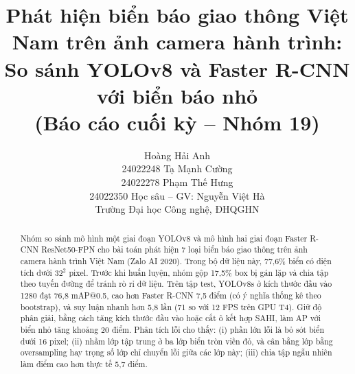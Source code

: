 \documentclass[11pt]{article}
\title{Phát hiện biển báo giao thông Việt Nam trên ảnh camera hành trình:\\
So sánh YOLOv8 và Faster R-CNN với biển báo nhỏ\\
(Báo cáo cuối kỳ -- Nhóm 19)}
\author{
Hoàng Hải Anh \\ 24022248
\And
Tạ Mạnh Cường \\ 24022278
\And
Phạm Thế Hưng \\ 24022350
\AND
Học sâu -- GV: Nguyễn Việt Hà \\
Trường Đại học Công nghệ, ĐHQGHN
}
\begin{document}
\maketitle

\begin{abstract}
Nhóm so sánh mô hình một giai đoạn YOLOv8 và mô hình hai giai đoạn Faster R-CNN ResNet50-FPN cho bài toán phát hiện 7 loại biển báo giao thông trên ảnh camera hành trình Việt Nam (Zalo AI 2020). Trong bộ dữ liệu này, 77,6\% biển có diện tích dưới $32^2$ pixel.
Trước khi huấn luyện, nhóm gộp 17,5\% box bị gán lặp và chia tập theo tuyến đường để tránh rò rỉ dữ liệu.
Trên tập test, YOLOv8s ở kích thước đầu vào 1280 đạt 76,8 mAP@0.5, cao hơn Faster R-CNN 7,5 điểm (có ý nghĩa thống kê theo bootstrap), và suy luận nhanh hơn 5,8 lần (71 so với 12 FPS trên GPU T4).
Giữ độ phân giải, bằng cách tăng kích thước đầu vào hoặc cắt ô kết hợp SAHI, làm AP với biển nhỏ tăng khoảng 20 điểm.
Phân tích lỗi cho thấy:
(i) phần lớn lỗi là bỏ sót biển dưới 16 pixel;
(ii) nhầm lớp tập trung ở ba lớp biển tròn viền đỏ, và cân bằng lớp bằng oversampling hay trọng số lớp chỉ chuyển lỗi giữa các lớp này;
(iii) chia tập ngẫu nhiên làm điểm cao hơn thực tế 5,7 điểm.
\end{abstract}













\end{document}
